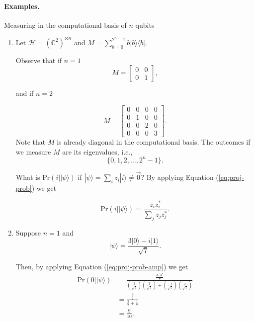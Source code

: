 \documentclass{article}
\newcommand{\ket}[1]{|#1\rangle}
\newcommand{\bra}[1]{\langle#1|}
\begin{document}
\paragraph{Examples.}
Measuring in the computational basis of $n$ qubits 
\begin{enumerate}
     \item
          Let $\mathcal H = \left( \mathbb C^2 \right)^{\otimes n}$ and
           $M = \sum^{2^n - 1}_{b=0} b \ket b \bra b$.
          
          Observe that if $n = 1$
          $$M = 
          \begin{bmatrix}
               0 & 0 \\ 0 & 1
          \end{bmatrix},
          $$
          
          and if $n = 2$
          
          $$M = 
          \begin{bmatrix}
               0 & 0 & 0 & 0 \\ 
               0 & 1 & 0 & 0 \\
               0 & 0 & 2 & 0 \\
               0 & 0 & 0 & 3
          \end{bmatrix}.
          $$
          Note that $M$ is already diagonal in the computational basis.
          The outcomes if we measure $M$ are its eigenvalues, i.e., 
          $$\{ 0, 1, 2, \dots, 2^n -1\}.$$
          
          What is $\mathrm{Pr}(i | \ket{\psi})$ 
          if $\ket \psi = \sum_{i} z_i \ket i \neq \vec 0$?
          By applying Equation (\ref{eq:proj-prob}) we get
          
          \begin{equation}
               \label{eq:proj-prob-amp}
               \mathrm{Pr}(i | \ket \psi) = \frac{z_i z^{*}_{i} }{\sum_{j} z_j z^{*}_j}.
          \end{equation}

     \item
          Suppose $n=1$ and
          $$ \ket \psi  = \frac{3 \ket 0 - i \ket 1}{\sqrt 7}.$$
          
          Then, by applying Equation (\ref{eq:proj-prob-amp}) we get
          \begin{align*}
               \mathrm{Pr}( 0 | \ket \psi)  &= \frac{ \frac{3 \cdot 3^*}{7} }
                                               {\left( \frac{3}{\sqrt 7} \right) 
                                              \left( \frac{3}{\sqrt 7} \right)  + 
                                             \left( \frac{-i}{\sqrt 7}\right) 
                                             \left( \frac{i}{\sqrt 7} \right)}\\
                                            &= \frac{\frac{9}{7}}
                                                    {\frac{9}{7} + \frac{1}{7}} \\
                                            &= \frac{9}{10}.
          \end{align*}
          

\end{enumerate}
\end{document}
